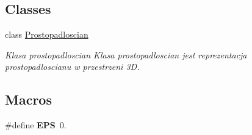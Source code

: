 \subsection*{Classes}
\begin{DoxyCompactItemize}
\item 
class \hyperlink{classProstopadloscian}{Prostopadloscian}
\begin{DoxyCompactList}\small\item\em Klasa prostopadloscian Klasa prostopadloscian jest reprezentacja prostopadloscianu w przestrzeni 3D. \end{DoxyCompactList}\end{DoxyCompactItemize}
\subsection*{Macros}
\begin{DoxyCompactItemize}
\item 
\mbox{\label{Prostopadloscian_8hh_a6ebf6899d6c1c8b7b9d09be872c05aae}} 
\#define {\bfseries E\+PS}~0.
\end{DoxyCompactItemize}
